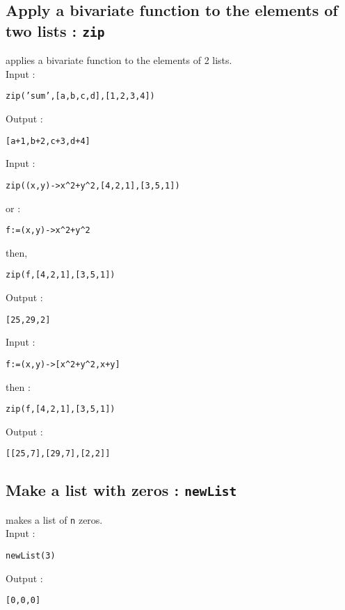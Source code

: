 \documentclass[a4paper,11pt]{book}
\begin{document}
\subsection{Apply a bivariate function to the elements of two lists : {\tt zip}}
 applies a bivariate function to the elements of 2 lists.\\
Input :
\begin{center}{\tt zip('sum',[a,b,c,d],[1,2,3,4])}\end{center}
Output :
\begin{center}{\tt   [a+1,b+2,c+3,d+4]}\end{center}
Input :
\begin{center}{\tt zip((x,y)->x\verb|^|2+y\verb|^|2,[4,2,1],[3,5,1])}\end{center}
or :
\begin{center}{\tt f:=(x,y)->x\verb|^|2+y\verb|^|2}\end{center}
then,
\begin{center}{\tt zip(f,[4,2,1],[3,5,1])}\end{center}
Output :
\begin{center}{\tt   [25,29,2]}\end{center}
Input :
\begin{center}{\tt f:=(x,y)->[x\verb|^|2+y\verb|^|2,x+y]}\end{center}
then :
\begin{center}{\tt zip(f,[4,2,1],[3,5,1])}\end{center}
Output :
\begin{center}{\tt   [[25,7],[29,7],[2,2]]}\end{center}

\subsection{Make a list with zeros : {\tt newList}}
 makes a list of {\tt n} zeros.\\
Input :
\begin{center}{\tt newList(3)}\end{center}
Output :
\begin{center}{\tt   [0,0,0]}\end{center}
\end{document}
